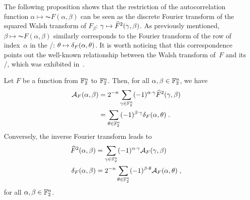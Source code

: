 The following proposition shows that the restriction of the autocorrelation function $\alpha \mapsto \AC{F}(\alpha,\beta)$ can be seen as the discrete Fourier transform of the squared Walsh transform of $F_\beta$: $\gamma \mapsto \widehat{F}^2(\gamma,\beta)$.
As previously mentioned, $\beta \mapsto \AC{F}(\alpha,\beta)$ similarly corresponds to the Fourier transform of the row of index~$\alpha$ in the \DDT/: $\theta \mapsto \delta_{F}(\alpha,\theta)$.
It is worth noticing that this correspondence points out the well-known relationship between the Walsh transform of~$F$ and its \DDT/, which was exhibited in~.

\begin{proposition}
  Let $F$ be a function from $\mathbb{F}_2^n$ to $\mathbb{F}_2^n$.
  Then, for all $\alpha,\beta \in \mathbb{F}_2^n$, we have
  \begin{align}
      \mathcal{A}_{F}(\alpha,\beta) &= 2^{-n} \sum_{\gamma \in \mathbb{F}_2^n} (-1)^{\alpha \cdot \gamma} \widehat{F}^2(\gamma,\beta) \label{eq1}\\
               &= \sum_{\theta \in \mathbb{F}_2^n} (-1)^{\beta \cdot \gamma} \delta_{F}(\alpha,\theta) \label{eq2}\;.
  \end{align}
  Conversely, the inverse Fourier transform leads to
  \begin{align}
       \widehat{F}^2(\alpha,\beta) &= \sum_{\gamma \in \mathbb{F}_2^n} (-1)^{\alpha \cdot \gamma} \mathcal{A}_{F}(\gamma,\beta) \label{eq3}\\
       \delta_{F}(\alpha,\beta) &= 2^{-n} \sum_{\theta \in \mathbb{F}_2^n} (-1)^{\beta \cdot \theta} \mathcal{A}_{F}(\alpha,\theta) \label{eq4}\;,
  \end{align}
  for all $\alpha,\beta \in \mathbb{F}_2^n$.
\end{proposition}
